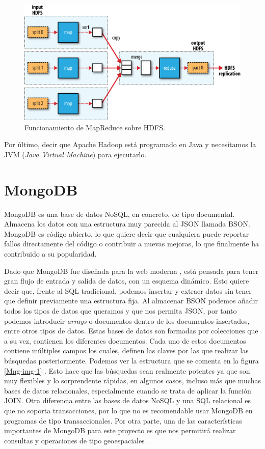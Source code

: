 \begin{figure}[htp]
\centering
\includegraphics[scale=0.28]{Imagenes/hadoop1.png}
\caption{Funcionamiento de MapReduce sobre HDFS.}
\label{hdImg1}
\end{figure}

Por último, decir que Apache Hadoop está programado en Java y necesitamos
la JVM (\emph{Java Virtual Machine}) para ejecutarlo.


\section{MongoDB\label{MongoDB}}

MongoDB es una base de datos NoSQL, en concreto, de tipo documental.
Almacena los datos con una estructura muy parecida al JSON llamada BSON.
MongoDB es código abierto, lo que quiere decir que cualquiera puede
reportar fallos directamente del código o contribuir a nuevas mejoras, lo
que finalmente ha contribuido a su popularidad.

Dado que MongoDB fue diseñada para la web moderna \cite{Mng-2}, está
pensada para tener gran flujo de entrada y salida de datos, con un esquema
dinámico. Esto quiere decir que, frente al SQL tradicional, podemos
insertar y extraer datos sin tener que definir previamente una estructura
fija. Al almacenar BSON podemos añadir todos los tipos de datos que
queramos y que nos permita JSON, por tanto podemos introducir \emph{arrays} o documentos
dentro de los documentos insertados, entre otros tipos de datos. Estas bases de datos son
formadas por colecciones que a su vez, contienen los diferentes documentos.
Cada uno de estos documentos contiene múltiples campos los cuales, definen
las claves por las que realizar las búsquedas posteriormente. Podemos ver
la estructura que se comenta en la figura \ref{Mng-img-1} \cite{Mng-5}. Esto hace que las
búsquedas sean realmente potentes ya que son muy flexibles y lo
sorprendente rápidas, en algunos casos, incluso más que muchas
bases de datos relacionales, especialmente cuando se trata de aplicar la función JOIN.
Otra diferencia entre las bases de datos NoSQL y una SQL relacional es que
no soporta transacciones, por lo que no es recomendable usar MongoDB en
programas de tipo transaccionales. Por otra parte, una de las
características importantes de MongoDB para este proyecto es que nos
permitirá realizar consultas y operaciones de tipo geoespaciales
\cite{Mng-3}.


